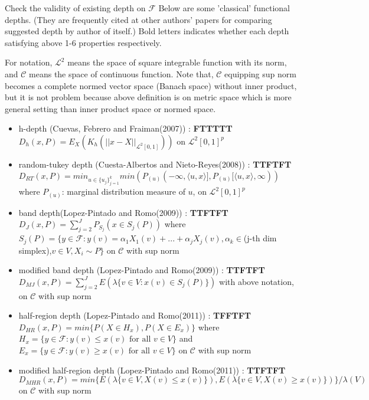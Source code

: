 \documentclass[aspectratio=169,ignorenonframetext,9pt]{beamer}
\theoremstyle{plain}
\theoremstyle{definition}
\begin{document}
\begin{frame}{Check the validity of existing depth on $\mathcal{F}$}
Below are some 'classical' functional depths.
(They are frequently cited at other authors' papers 
for comparing suggested depth by author of itself.)
Bold letters indicates whether each depth satisfying above 1-6 properties respectively.

For notation, $\mathcal{L}^2$ means the space of square integrable function with its norm,
and $\mathcal{C}$ means the space of continuous function.
Note that, $\mathcal{C}$ equipping sup norm becomes a complete normed vector space (Banach space)
without inner product, but it is not problem because above definition is on metric space
which is more general setting than inner product space or normed space.

\begin{itemize}
    \item h-depth (Cuevas, Febrero and Fraiman(2007)) : \textbf{FTTTTT}\\
    $D_h(x,P)=E_X(K_h(||x-X||_{\mathcal{L}^2[0,1]}))$ on $\mathcal{L}^2[0,1]^p$ 
    \item random-tukey depth (Cuesta-Albertos and Nieto-Reyes(2008)) : \textbf{TTFTFT}\\
    $D_{RT}(x,P)=min_{u\in\{u_j\}_{j=1}^k}min(P_{(u)}(-\infty,\langle u,x \rangle], P_{(u)}[\langle u,x \rangle,\infty))$ \\
    where $P_{(u)}$: marginal distribution measure of $u$, on $\mathcal{L}^2[0,1]^p$
    \item band depth(Lopez-Pintado and Romo(2009)) : \textbf{TTFTFT}\\
    $D_J(x,P)=\sum_{j=2}^J P_{S_j}(x\in S_j(P))$ where $S_j(P)=\{y\in\mathcal{F} : y(v)=\alpha_1X_1(v)+...+\alpha_jX_j(v), \alpha_k\in$(j-th dim simplex),$ v\in V, X_i\sim P\}$
    on $\mathcal{C}$ with sup norm 
    \item modified band depth (Lopez-Pintado and Romo(2009)) : \textbf{TTFTFT}\\
    $D_{MJ}(x,P)=\sum_{j=2}^J E(\lambda \{v\in V : x(v)\in S_j(P)\})$ with above notation,
    on $\mathcal{C}$ with sup norm 
    \item half-region depth (Lopez-Pintado and Romo(2011)) : \textbf{TFFTFT}\\
    $D_{HR}(x,P)=min\{P(X\in H_x), P(X\in E_x)\}$ where $H_x=\{y\in\mathcal{F} : y(v)\leq x(v) \text{ for all } v\in V\}$ and 
    $E_x=\{y\in\mathcal{F} : y(v)\geq x(v) \text{ for all } v\in V\}$ on $\mathcal{C}$ with sup norm 
    \item modified half-region depth (Lopez-Pintado and Romo(2011)) : \textbf{TTFTFT}\\
    $D_{MHR}(x,P)=min\{E(\lambda\{v\in V, X(v)\leq x(v)\}), E(\lambda\{v\in V, X(v)\geq x(v)\})\}/\lambda(V)$
    on $\mathcal{C}$ with sup norm
\end{itemize}

\end{frame}
\end{document}
